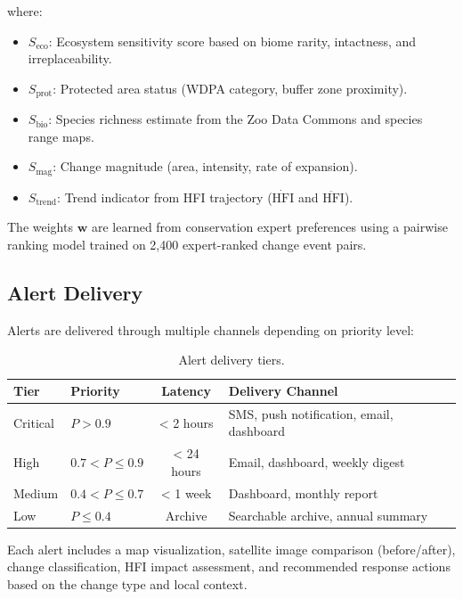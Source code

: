 \documentclass[11pt,a4paper]{article}
\begin{document}
\noindent where:
\begin{itemize}[leftmargin=*]
    \item $S_{\text{eco}}$: Ecosystem sensitivity score based on biome rarity, intactness, and irreplaceability.
    \item $S_{\text{prot}}$: Protected area status (WDPA category, buffer zone proximity).
    \item $S_{\text{bio}}$: Species richness estimate from the Zoo Data Commons and species range maps.
    \item $S_{\text{mag}}$: Change magnitude (area, intensity, rate of expansion).
    \item $S_{\text{trend}}$: Trend indicator from HFI trajectory ($\dot{\text{HFI}}$ and $\ddot{\text{HFI}}$).
\end{itemize}

The weights $\mathbf{w}$ are learned from conservation expert preferences using a pairwise ranking model trained on 2,400 expert-ranked change event pairs.

\subsection{Alert Delivery}

Alerts are delivered through multiple channels depending on priority level:

\begin{table}[H]
\centering
\caption{Alert delivery tiers.}
\label{tab:alert_tiers}
\begin{tabularx}{\textwidth}{@{}llcX@{}}
\toprule
\textbf{Tier} & \textbf{Priority} & \textbf{Latency} & \textbf{Delivery Channel} \\
\midrule
Critical & $P > 0.9$ & < 2 hours & SMS, push notification, email, dashboard \\
High & $0.7 < P \leq 0.9$ & < 24 hours & Email, dashboard, weekly digest \\
Medium & $0.4 < P \leq 0.7$ & < 1 week & Dashboard, monthly report \\
Low & $P \leq 0.4$ & Archive & Searchable archive, annual summary \\
\bottomrule
\end{tabularx}
\end{table}

Each alert includes a map visualization, satellite image comparison (before/after), change classification, HFI impact assessment, and recommended response actions based on the change type and local context.
\end{document}
